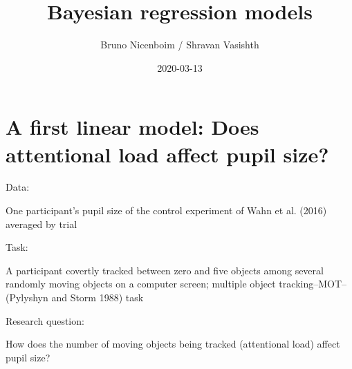 \documentclass[12pt,ignorenonframetext,aspectratio=169]{beamer}
\title{Bayesian regression models}
\author{Bruno Nicenboim / Shravan Vasishth}
\date{2020-03-13}
\begin{document}
\frame{\titlepage}

\begin{frame}
\tableofcontents[hideallsubsections]
\end{frame}
\hypertarget{sec:pupil}{%
\section{A first linear model: Does attentional load affect pupil size?}\label{sec:pupil}}

\small

\normalsize

\begin{frame}

\begin{block}{Data:}

One participant's pupil size of the control experiment of Wahn et al. (2016) averaged by trial

\end{block}

\begin{block}{Task:}

A participant covertly tracked between zero and five objects among several randomly moving objects on a computer screen; multiple object tracking--MOT-- (Pylyshyn and Storm 1988) task

\end{block}

\begin{block}{Research question:}

How does the number of moving objects being tracked (attentional load) affect pupil size?

\end{block}

\end{frame}
\end{document}
